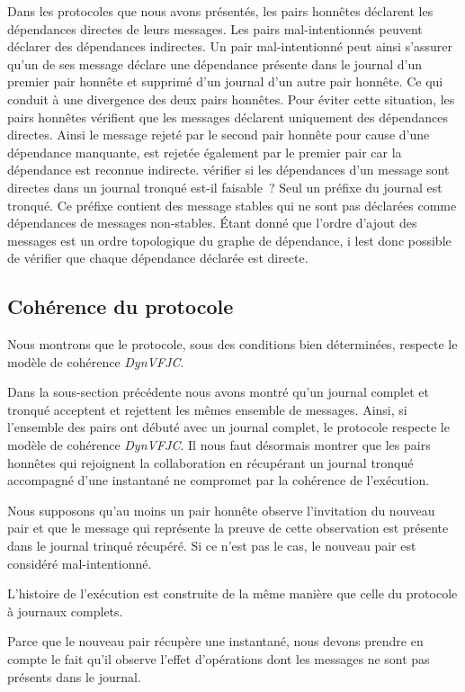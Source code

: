 Dans les protocoles que nous avons présentés, les pairs honnêtes déclarent les dépendances directes de leurs messages.
Les pairs mal-intentionnés peuvent déclarer des dépendances indirectes.
Un pair mal-intentionné peut ainsi s'assurer qu'un de ses message déclare une dépendance présente dans le journal d'un premier pair honnête et supprimé d'un journal d'un autre pair honnête.
Ce qui conduit à une divergence des deux pairs honnêtes.
Pour éviter cette situation, les pairs honnêtes vérifient que les messages déclarent uniquement des dépendances directes.
Ainsi le message rejeté par le second pair honnête pour cause d'une dépendance manquante, est rejetée également par le premier pair car la dépendance est reconnue indirecte.
vérifier si les dépendances d'un message sont directes dans un journal tronqué est-il faisable~?
Seul un préfixe du journal est tronqué.
Ce préfixe contient des message stables qui ne sont pas déclarées comme dépendances de messages non-stables.
Étant donné que l'ordre d'ajout des messages est un ordre topologique du graphe de dépendance, i lest donc possible de vérifier que chaque dépendance déclarée est directe.

\subsection{Cohérence du protocole}

Nous montrons que le protocole, sous des conditions bien déterminées, respecte le modèle de cohérence \emph{DynVFJC}.

Dans la sous-section précédente nous avons montré qu'un journal complet et tronqué acceptent et rejettent les mêmes ensemble de messages.
Ainsi, si l'ensemble des pairs ont débuté avec un journal complet, le protocole respecte le modèle de cohérence \emph{DynVFJC}.
Il nous faut désormais montrer que les pairs honnêtes qui rejoignent la collaboration en récupérant un journal tronqué accompagné d'une instantané ne compromet par la cohérence de l'exécution.

Nous supposons qu'au moins un pair honnête observe l'invitation du nouveau pair et que le message qui représente la preuve de cette observation est présente dans le journal trinqué récupéré.
Si ce n'est pas le cas, le nouveau pair est considéré mal-intentionné.

L'histoire de l'exécution est construite de la même manière que celle du protocole à journaux complets.

Parce que le nouveau pair récupère une instantané, nous devons prendre en compte le fait qu'il observe l'effet d'opérations dont les messages ne sont pas présents dans le journal.

